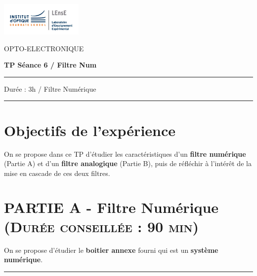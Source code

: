 \documentclass[a4paper,11pt]{article}
\begin{document}
\newpage
\begin{minipage}[c]{.25\linewidth}
	\includegraphics[width=4cm]{images/LEnsE_IOGS.jpg}
\end{minipage} \hfill
\begin{minipage}[c]{.4\linewidth}

\begin{center}
\vspace{0.3cm}
{\Large OPTO-ELECTRONIQUE}

\medskip

\textbf{\Large TP Séance 6 / Filtre Num}

\end{center}
\end{minipage}\hfill

\begin{center}
\vspace{0.3cm}

\noindent \rule{\linewidth}{1pt}

Durée : 3h / Filtre Numérique

\vspace{-0.2cm}
\noindent \rule{\linewidth}{1pt}
\end{center}



\section*{Objectifs de l'expérience}

On se propose dans ce TP d'étudier les caractéristiques d'un \textbf{filtre numérique} (Partie A) et d'un \textbf{filtre analogique} (Partie B), puis de réfléchir à l'intérêt de la mise en cascade de ces deux filtres.


\section{PARTIE A - Filtre \textbf{Numérique} \textsc{\normalsize(Durée conseillée : 90 min)}}

On se propose d'étudier le \textbf{boitier annexe} fourni qui est un \textbf{système numérique}.

\noindent \rule{\linewidth}{1pt}
\end{document}
